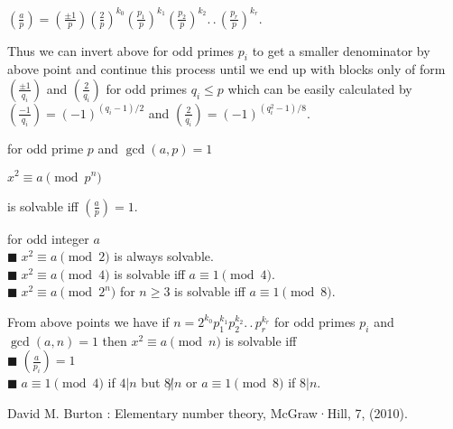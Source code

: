 \documentclass[11pt]{extarticle}
\newcommand{\ck}{.\,.\,}
\newcommand{\tbx}[2][]{
\begin{tcolorbox}[enhanced,breakable,size=small,colback=black!2!white,title={#1},arc is angular, arc=1.5mm,
	drop fuzzy shadow]
	#2
\end{tcolorbox}
}
\newcommand{\y}{$\blacksquare\;$}
\begin{document}
\begin{multicols}{2}
{\begin{center}
 $ (\frac{ a }{p})=(\frac{ \pm1 }{p} ) (\frac{ 2 }{p})^{k_0}(\frac{ p_1 }{p})^{k_1}(\frac{ p_2 }{p})^{k_2}\ck( \frac{ p_r }{p})^{k_r} . $ 
 \end{center}
 
Thus we can invert above for odd primes $ p_i $ to get a smaller denominator by above point and continue this process until we end up with blocks only of form $ (\frac{ \pm 1 }{q_i}) $ and $ (\frac{ 2 }{q_i}) $ for odd primes $ q_i\leq p $ which can be easily calculated by $ (\frac{ -1 }{q_i} )=(-1)^{(q_i-1)/2} $ and $ (\frac{ 2 }{q_i} )=(-1)^{(q_i^2-1)/8} $.}
\tbx{ for odd prime $ p $ and $ \gcd(a,p)=1 $ 
\begin{center}
 $  x^2\equiv a\pmod{p^n} $ 
 \end{center}
 is solvable iff $ (\frac{ a }{p})=1. $}
\tbx{ for odd integer $ a $ \\
\y $ x^2\equiv a\pmod{2} $ is always solvable.\\
\y $ x^2\equiv a\pmod{4} $ is solvable iff $ a\equiv 1\pmod{4} $.\\
\y $ x^2\equiv a\pmod{2^n} $ for $ n\geq 3 $ is solvable iff $ a\equiv 1\pmod{8} $. }
\tbx{ From above points we have if $ n=  2^{k_0}p_1^{k_1}p_2^{k_2}\ck p_r^{k_r} $ for odd primes $ p_i $ and $ \gcd(a,n) =1$ then $ x^2\equiv a\pmod{n} $ is solvable iff\\
	\y $ (\frac{ a }{p_i})=1 $ \\
	\y $ a\equiv1\pmod{4} $ if $ 4|n $ but $ 8\not|n $  or $ a\equiv1\pmod{8} $ if $ 8|n $.}
	\begin{thebibliography}{9}
		David M. Burton : Elementary number theory, McGraw·Hill, 7, (2010).
	\end{thebibliography}
\end{multicols}
\end{document}
